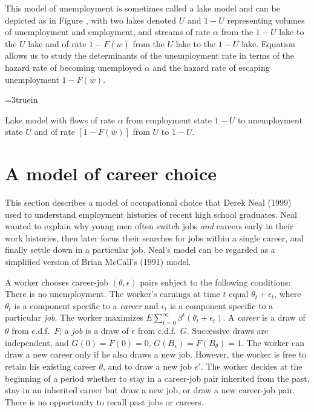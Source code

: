   This model of unemployment   is sometimes called a lake model and
can be depicted as in Figure , %
 with two lakes denoted
$U$ and $1-U$ representing volumes of unemployment and employment, and streams
of rate $\alpha$ from the $1-U$ lake to the $U$ lake
 and of rate $1-F(\overline w)$ from
the $U$ lake  to the $1-U$ lake.    Equation  allows us to
study the determinants of the  unemployment rate in
terms of the hazard rate of becoming unemployed $\alpha$ and
the hazard rate of escaping unemployment $1 - F(\overline w)$.


\centerline{\epsfxsize=3truein}
\caption{Lake model with flows of rate $\alpha$ from employment state $1-U$ to
unemployment state $U$ and of rate $[1-F(\overline w)]$ from $U$ to $1-U$.}
\endfigure


\section{A model of career choice}

%
This section describes a model of occupational choice that
Derek Neal (1999) used to understand  employment histories
of recent high school graduates.   Neal wanted to explain
why young men often switch jobs {\it and\/} careers  early in their
work histories, then later focus their searches for  jobs within a single
career, and finally settle down in a particular
job. Neal's model  can be regarded
as a simplified version of Brian McCall's (1991) model.

 A worker chooses career-job $(\theta,\epsilon)$ pairs
subject to the following conditions:  There is no
unemployment.  The worker's earnings
at time $t$ equal $\theta_t + \epsilon_t$, where $\theta_t$ is a component specific to a {\it career\/}
and ${\epsilon_t}$ is a component specific to a particular {\it job}.  The worker
maximizes $E \sum_{t=0}^\infty  \beta^t (\theta_t + \epsilon_t).$
A {\it career\/} is a draw
of $\theta$ from  c.d.f.\  $F$; a {\it job\/} is a draw of
$\epsilon$ from c.d.f.\ $G$.   Successive draws are independent,
and $G(0)=F(0)=0$, $G(B_\epsilon)= F(B_\theta)=1$.  The
worker can draw a new career only if he also draws a
new job.
 However, the worker is free to retain his existing
career $\theta$, and to draw a new job $\epsilon'$.  The worker
decides at the beginning of a period whether to stay in a
career-job pair inherited from the past, stay in an inherited career but
draw  a new job, or  draw a new career-job pair.  There is
no opportunity to  recall  past jobs or careers.

